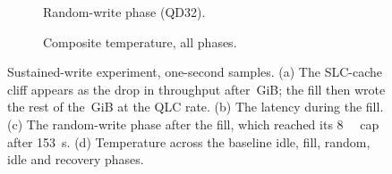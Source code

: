 \begin{figure}[!htbp]
{    \begin{subfigure}[t]{0.49\linewidth}
      \caption{Random-write phase (QD32).}
    \end{subfigure}\hfill
    \begin{subfigure}[t]{0.49\linewidth}
      \caption{Composite temperature, all phases.}
    \end{subfigure}%
  }
  \caption{Sustained-write experiment, one-second samples. (a) The SLC-cache cliff appears as the drop in
  throughput after \,GiB; the fill then wrote the rest of the
  \,GiB at the QLC rate. (b) The latency during the fill. (c) The
  random-write phase after the fill, which reached its \qty{8}{\gibi\byte} cap after \qty{153}{\second}.
  (d) Temperature across the baseline idle, fill, random, idle and recovery phases.}\label{fig:sustained}
\end{figure}

